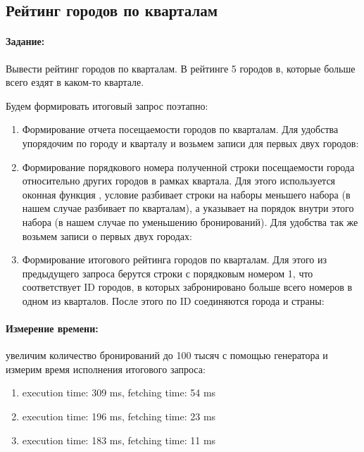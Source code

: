\subsection{Рейтинг городов по кварталам}

\paragraph{Задание:} Вывести рейтинг городов по кварталам. В рейтинге 5 городов в, которые больше всего ездят в каком-то квартале.

Будем формировать итоговый запрос поэтапно:
\begin{enumerate}[leftmargin=0em]
	\item Формирование отчета посещаемости городов по кварталам. Для удобства упорядочим по городу и кварталу и возьмем записи для первых двух городов:


	\item Формирование порядкового номера полученной строки посещаемости города относительно других городов в рамках квартала. Для этого используется оконная функция , условие  разбивает строки на наборы меньшего набора (в нашем случае разбивает по кварталам), а  указывает на порядок внутри этого набора (в нашем случае по уменьшению бронирований). Для удобства так же возьмем записи о первых двух городах:

	\item Формирование итогового рейтинга городов по кварталам. Для этого из предыдущего запроса берутся строки с порядковым номером 1, что соответствует ID городов, в которых забронировано больше всего номеров в одном из кварталов. После этого по ID соединяются города и страны:
\end{enumerate}

\paragraph{Измерение времени:} увеличим количество бронирований до 100 тысяч с помощью генератора и измерим время исполнения итогового запроса:

\begin{enumerate}
	\item execution time: 309 ms, fetching time: 54 ms
	\item execution time: 196 ms, fetching time: 23 ms
	\item execution time: 183 ms, fetching time: 11 ms
\end{enumerate}

